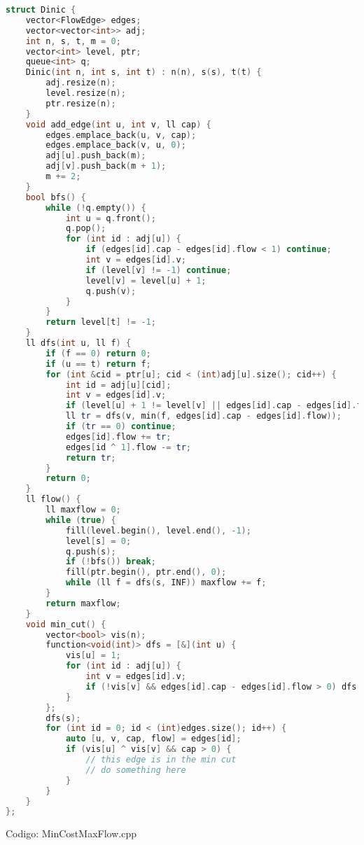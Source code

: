 \documentclass[10pt, a4paper, oneside]{book}
\begin{document}
\begin{lstlisting}[language=C++]
struct Dinic {
    vector<FlowEdge> edges;
    vector<vector<int>> adj;
    int n, s, t, m = 0;
    vector<int> level, ptr;
    queue<int> q;
    Dinic(int n, int s, int t) : n(n), s(s), t(t) {
        adj.resize(n);
        level.resize(n);
        ptr.resize(n);
    }
    void add_edge(int u, int v, ll cap) {
        edges.emplace_back(u, v, cap);
        edges.emplace_back(v, u, 0);
        adj[u].push_back(m);
        adj[v].push_back(m + 1);
        m += 2;
    }
    bool bfs() {
        while (!q.empty()) {
            int u = q.front();
            q.pop();
            for (int id : adj[u]) {
                if (edges[id].cap - edges[id].flow < 1) continue;
                int v = edges[id].v;
                if (level[v] != -1) continue;
                level[v] = level[u] + 1;
                q.push(v);
            }
        }
        return level[t] != -1;
    }
    ll dfs(int u, ll f) {
        if (f == 0) return 0;
        if (u == t) return f;
        for (int &cid = ptr[u]; cid < (int)adj[u].size(); cid++) {
            int id = adj[u][cid];
            int v = edges[id].v;
            if (level[u] + 1 != level[v] || edges[id].cap - edges[id].flow < 1) continue;
            ll tr = dfs(v, min(f, edges[id].cap - edges[id].flow));
            if (tr == 0) continue;
            edges[id].flow += tr;
            edges[id ^ 1].flow -= tr;
            return tr;
        }
        return 0;
    }
    ll flow() {
        ll maxflow = 0;
        while (true) {
            fill(level.begin(), level.end(), -1);
            level[s] = 0;
            q.push(s);
            if (!bfs()) break;
            fill(ptr.begin(), ptr.end(), 0);
            while (ll f = dfs(s, INF)) maxflow += f;
        }
        return maxflow;
    }
    void min_cut() {
        vector<bool> vis(n);
        function<void(int)> dfs = [&](int u) {
            vis[u] = 1;
            for (int id : adj[u]) {
                int v = edges[id].v;
                if (!vis[v] && edges[id].cap - edges[id].flow > 0) dfs(v);
            }
        };
        dfs(s);
        for (int id = 0; id < (int)edges.size(); id++) {
            auto [u, v, cap, flow] = edges[id];
            if (vis[u] ^ vis[v] && cap > 0) {
                // this edge is in the min cut
                // do something here
            }
        }
    }
};
\end{lstlisting}
\hfill

Codigo: MinCostMaxFlow.cpp
\end{document}
